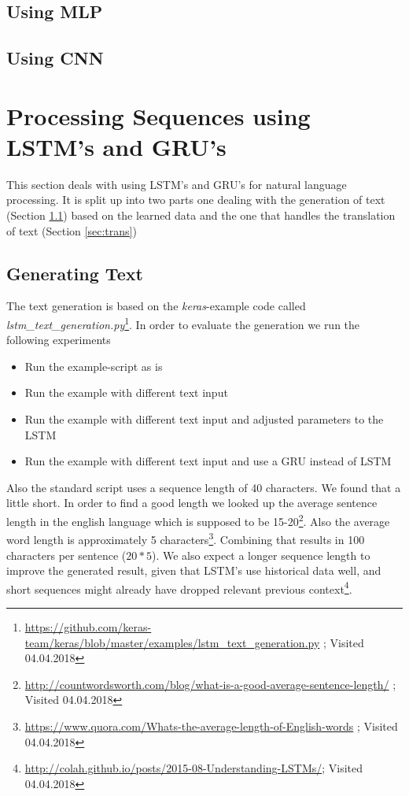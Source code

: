 \documentclass{article}
\begin{document}
\subsection{Using MLP}


\subsection{Using CNN}



\section{Processing Sequences using LSTM's and GRU's}
\label{sec:seq}
This section deals with using LSTM's and GRU's for natural language processing.
It is split up into two parts one dealing with the generation of text (Section \ref{sec:gen}) based on the learned data and the one that handles the translation of text (Section \ref{sec:trans})
\subsection{Generating Text}
\label{sec:gen}
The text generation is based on the \textit{keras}-example code called \textit{lstm\_text\_generation.py}\footnote{\url{https://github.com/keras-team/keras/blob/master/examples/lstm_text_generation.py} ; Visited 04.04.2018}.
In order to evaluate the generation we run the following experiments
\begin{itemize}
\item{Run the example-script as is}
\item{Run the example with different text input}
\item{Run the example with different text input and adjusted parameters to the LSTM}
\item{Run the example with different text input and use a GRU instead of LSTM}
\end{itemize}

Also the standard script uses a sequence length of 40 characters. We found that a little short. In order to find a good length we looked up the average sentence length in the english language which is supposed to be 15-20\footnote{\url{http://countwordsworth.com/blog/what-is-a-good-average-sentence-length/} ; Visited 04.04.2018}.
Also the average word length is approximately 5 characters\footnote{\url{https://www.quora.com/Whats-the-average-length-of-English-words} ; Visited 04.04.2018}. Combining that results in 100 characters per sentence ($20 * 5$). We also expect a longer sequence length to improve the generated result, given that LSTM's use historical data well, and short sequences might already have dropped relevant previous context\footnote{\url{http://colah.github.io/posts/2015-08-Understanding-LSTMs/}; Visited 04.04.2018}.
\end{document}
